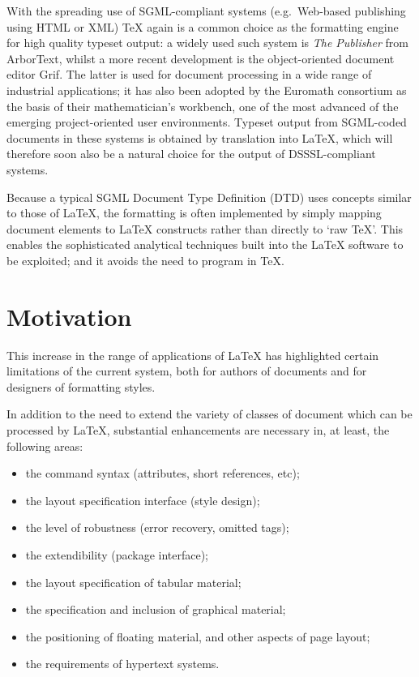 \documentclass[a4paper]{article}
\newcommand{\eg}{e.g.~}
\newcommand{\SGML}{{\sc SGML}}
\newcommand{\DSSSL}{{\sc DSSSL}}
\newcommand{\HTML}{{\sc HTML}}
\newcommand{\XML}{{\sc XML}}
\begin{document}
With the spreading use of \SGML{}-compliant systems (\eg Web-based
publishing using \HTML{} or \XML{}) \TeX{} again is a common choice as
the formatting engine for high quality typeset output: a widely used
such system is {\em The Publisher\/} from ArborText, whilst a more
recent development is the object-oriented document editor Grif.  The
latter is used for document processing in a wide range of industrial
applications; it has also been adopted by the Euromath consortium as
the basis of their mathematician's workbench, one of the most advanced
of the emerging project-oriented user environments.  Typeset output
from \SGML{}-coded documents in these systems is obtained by
translation into \LaTeX{}, which will therefore soon also be a natural
choice for the output of \DSSSL-compliant systems.

Because a typical \SGML{} Document Type Definition (DTD) uses concepts
similar to those of \LaTeX{}, the formatting is often implemented by
simply mapping document elements to \LaTeX{} constructs rather than
directly to `raw \TeX'.
This enables the
sophisticated analytical techniques built into the \LaTeX{}
software to be exploited; and it avoids the need to program in \TeX{}.

\section{Motivation}

This increase in the range of applications of \LaTeX{} has highlighted
certain limitations of the current system, both for authors of
documents and for designers of formatting styles.

In addition to the need to extend the variety of classes of document
which can be processed by \LaTeX{}, substantial enhancements are
necessary in, at least, the following areas:
 \begin{itemize}
 \item
   the command syntax (attributes, short references, etc);
 \item
   the layout specification interface (style design);
 \item
   the level of robustness (error recovery, omitted tags);
 \item
   the extendibility (package interface);
 \item
   the layout specification of tabular material;
 \item 
   the specification and inclusion of graphical material;
 \item 
   the positioning of floating material, and other aspects of page
   layout;
 \item
   the requirements of hypertext systems.
 \end{itemize}
\end{document}
